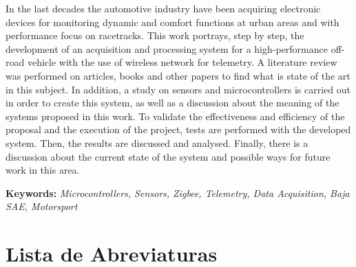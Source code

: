 \noindent In the last decades the automotive industry have been acquiring electronic devices for monitoring dynamic and comfort functions at urban areas and with performance focus on racetracks. This work portrays, step by step, the development of an acquisition and processing system for a high-performance off-road vehicle with the use of wireless network for telemetry. A literature review was performed on articles, books and other papers to find what is state of the art in this subject. In addition, a study on sensors and microcontrollers is carried out in order to create this system, as well as a discussion about the meaning of the systems proposed in this work. To validate the effectiveness and efficiency of the proposal and the execution of the project, tests are performed with the developed system. Then, the results are discussed and analysed. Finally, there is a discussion about the current state of the system and possible ways for future work in this area.        




\noindent \textbf{Keywords:} \textit{Microcontrollers, Sensors, Zigbee, Telemetry, Data Acquisition, Baja SAE, Motorsport} 

\tableofcontents
\listoffigures
\listoftables
\newpage
\chapter*{Lista de Abreviaturas\hfill} 
\listofsymbols

\newpage
\pagestyle{myheadings}
